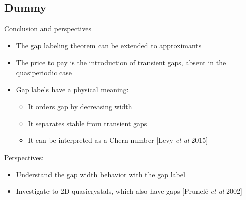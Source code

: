 \documentclass[xcolor=x11names,compress,professionalfonts]{beamer}
\renewcommand{\(}{\begin{columns}}
\renewcommand{\)}{\end{columns}}
\newcommand{\<}[1]{\begin{column}{#1}}
\renewcommand{\>}{\end{column}}
\begin{document}
\subsection{Dummy}
\begin{frame}{Conclusion and perspectives}
\begin{itemize}
	\item The gap labeling theorem can be extended to approximants
	\item The price to pay is the introduction of transient gaps, absent in the quasiperiodic case
	\item Gap labels have a physical meaning:
	\begin{itemize}
		\item It orders gap by decreasing width
		\item It separates stable from transient gaps
		\item It can be interpreted as a Chern number \small{[Levy \emph{et al} 2015]}
	\end{itemize}
\end{itemize}
Perspectives:
\begin{itemize}
	\item Understand the gap width behavior with the gap label
	\item Investigate to 2D quasicrystals, which also have gaps \small{[Prunelé \emph{et al} 2002]}
\end{itemize}
\end{frame}
\end{document}
